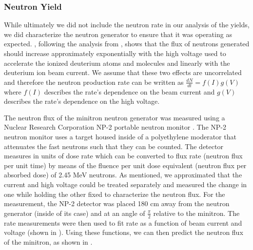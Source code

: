 \subsubsection{Neutron Yield}

While ultimately we did not include the neutron rate in our analysis of the yields, we did characterize the neutron generator to ensure that it was operating as expected.  , following the analysis from , shows that the flux of neutrons generated should increase approximately exponentially with the high voltage used to accelerate the ionized deuterium atoms and molecules and linearly with the deuterium ion beam current.  We assume that these two effects are uncorrelated and therefore the neutron production rate can be written as $\frac{dN}{dt} = f(I)g(V)$ where $f(I)$ describes the rate's dependence on the beam current and $g(V)$ describes the rate's dependence on the high voltage.

The neutron flux of the minitron neutron generator was measured using a Nuclear Research Corporation NP-2 portable neutron monitor \cite{np2_manual}.  The NP-2 neutron monitor uses a  target housed inside of a polyethylene moderator that attenuates the fast neutrons such that they can be counted.  The detector measures in units of dose rate which can be converted to flux rate (neutron flux per unit time) by means of the fluence per unit dose equivalent (neutron flux per absorbed dose) of 2.45 MeV neutrons.  As mentioned, we approximated that the current and high voltage could be treated separately and measured the change in one while holding the other fixed to characterize the neutron flux.  For the measurement, the NP-2 detector was placed 180 cm away from the neutron generator (inside of its case) and at an angle of $\frac{\pi}{2}$ relative to the minitron.  The rate measurements were then used to fit rate as a function of beam current and voltage (shown in ).  Using these functions, we can then predict the neutron flux of the minitron, as shown in .


